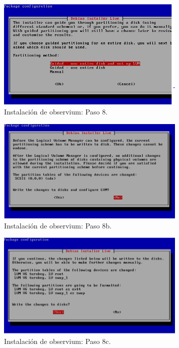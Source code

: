\begin{figure}[htbp!]
	\centering
		\includegraphics[width=0.8\textwidth]{images/desarrollo/instalarObservium_paso8.png}
	\caption{Instalación de observium: Paso 8.}
\end{figure}

\begin{figure}[htbp!]
	\centering
		\includegraphics[width=0.8\textwidth]{images/desarrollo/instalarObservium_paso8b.png}
	\caption{Instalación de observium: Paso 8b.}
\end{figure}

\begin{figure}[htbp!]
	\centering
		\includegraphics[width=0.8\textwidth]{images/desarrollo/instalarObservium_paso8c.png}
	\caption{Instalación de observium: Paso 8c.}
\end{figure}

